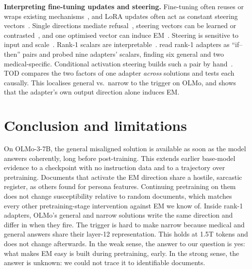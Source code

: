 \documentclass{article}
\begin{document}
\textbf{Interpreting fine-tuning updates and steering.} Fine-tuning often reuses or wraps existing
mechanisms~\citep{jain2023mechanistically,prakash2024finetuning}, and LoRA updates often act as constant steering
vectors~\citep{wang2025simple}. Single directions mediate refusal~\citep{arditi2024refusal}, steering vectors can be
learned or contrasted~\citep{turner2023steering,panickssery2023steering,zou2023representation}, and one optimised vector
can induce EM~\citep{dunefsky2025oneshot,cao2026activation}. Steering is sensitive to input and scale~\citep{tan2024analyzing}.
Rank-1 scalars are interpretable~\citep{ward2025rank1}. \citet{soligo2025convergent} read rank-1 adapters as
``if--then'' pairs and probed nine adapters' scalars, finding six general and two medical-specific.
Conditional activation steering builds such a pair by hand~\citep{lee2024programming}. TOD compares the two factors of one
adapter \emph{across} solutions and tests each causally. This localises general vs.\ narrow to the trigger on OLMo, and
shows that the adapter's own output direction alone induces EM.

\section{Conclusion and limitations}

On OLMo-3-7B, the general misaligned solution is available as soon as the model answers coherently, long before
post-training. This extends earlier base-model evidence to a checkpoint with no instruction data and to a trajectory over
pretraining. Documents that activate the EM direction share a hostile, sarcastic register, as others found for persona
features. Continuing pretraining on them does not change susceptibility relative to random documents,
which matches every other pretraining-stage intervention against EM we know of. Inside rank-1 adapters, OLMo's general and
narrow solutions write the same direction and differ in when they fire. The trigger is hard to make narrow because medical
and general answers share their layer-12 representation. This holds at 1.5T tokens and does not change afterwards. In the weak
sense, the answer to our question is yes: what makes EM easy is built during pretraining, early. In the strong sense, the
answer is unknown: we could not trace it to identifiable documents.
\end{document}
